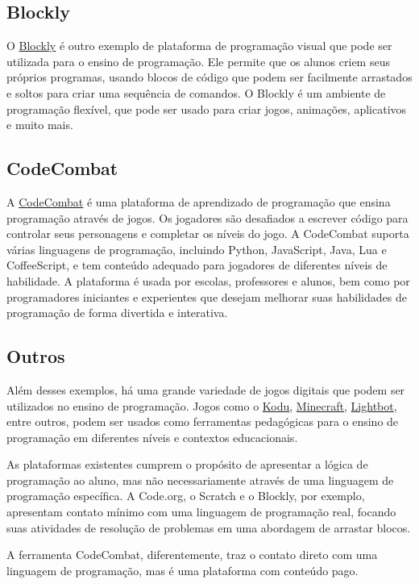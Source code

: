 \subsection{Blockly}

O \href{https://blockly.games/}{Blockly} é outro exemplo de plataforma de programação visual que pode ser utilizada para o ensino de programação. Ele permite que os alunos criem seus próprios programas, usando blocos de código que podem ser facilmente arrastados e soltos para criar uma sequência de comandos. O Blockly é um ambiente de programação flexível, que pode ser usado para criar jogos, animações, aplicativos e muito mais.

\subsection{CodeCombat}
A \href{https://codecombat.com/}{CodeCombat} é uma plataforma de aprendizado de programação que ensina programação através de jogos. Os jogadores são desafiados a escrever código para controlar seus personagens e completar os níveis do jogo. A CodeCombat suporta várias linguagens de programação, incluindo Python, JavaScript, Java, Lua e CoffeeScript, e tem conteúdo adequado para jogadores de diferentes níveis de habilidade. A plataforma é usada por escolas, professores e alunos, bem como por programadores iniciantes e experientes que desejam melhorar suas habilidades de programação de forma divertida e interativa.

\subsection{Outros}
Além desses exemplos, há uma grande variedade de jogos digitais que podem ser utilizados no ensino de programação. Jogos como o \href{https://www.kodugamelab.com/}{Kodu}, \href{https://www.minecraft.net/pt-br}{Minecraft}, \href{https://lightbot.com/}{Lightbot}, entre outros, podem ser usados como ferramentas pedagógicas para o ensino de programação em diferentes níveis e contextos educacionais.

As plataformas existentes cumprem o propósito de apresentar a lógica de programação ao aluno, mas não necessariamente através de uma linguagem de programação específica. A Code.org, o Scratch e o Blockly, por exemplo, apresentam contato mínimo com uma linguagem de programação real, focando suas atividades de resolução de problemas  em uma abordagem de arrastar blocos.

A ferramenta CodeCombat, diferentemente, traz o contato direto com uma linguagem de programação, mas é uma plataforma com conteúdo pago.